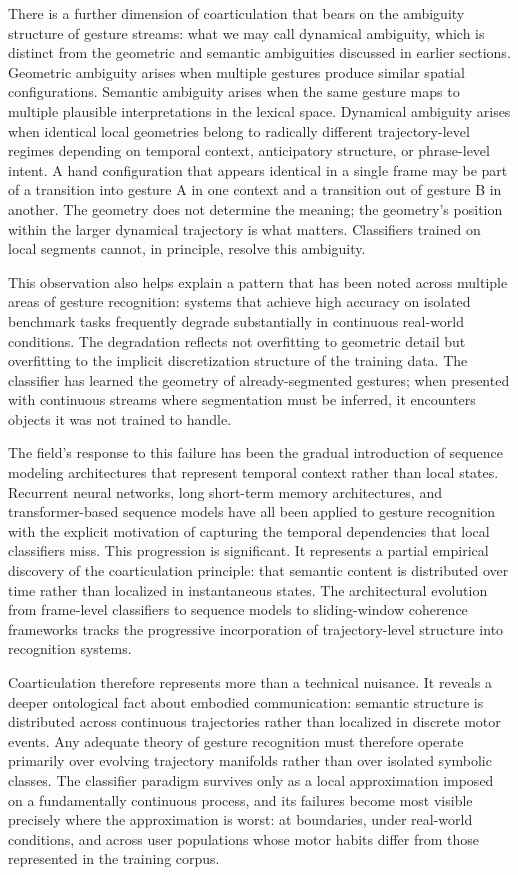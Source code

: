 \documentclass[11pt, a4paper]{article}
\theoremstyle{definition}
\begin{document}
There is a further dimension of coarticulation that bears on the ambiguity structure of gesture streams: what we may call dynamical ambiguity, which is distinct from the geometric and semantic ambiguities discussed in earlier sections. Geometric ambiguity arises when multiple gestures produce similar spatial configurations. Semantic ambiguity arises when the same gesture maps to multiple plausible interpretations in the lexical space. Dynamical ambiguity arises when identical local geometries belong to radically different trajectory-level regimes depending on temporal context, anticipatory structure, or phrase-level intent. A hand configuration that appears identical in a single frame may be part of a transition into gesture A in one context and a transition out of gesture B in another. The geometry does not determine the meaning; the geometry's position within the larger dynamical trajectory is what matters. Classifiers trained on local segments cannot, in principle, resolve this ambiguity.

This observation also helps explain a pattern that has been noted across multiple areas of gesture recognition: systems that achieve high accuracy on isolated benchmark tasks frequently degrade substantially in continuous real-world conditions. The degradation reflects not overfitting to geometric detail but overfitting to the implicit discretization structure of the training data. The classifier has learned the geometry of already-segmented gestures; when presented with continuous streams where segmentation must be inferred, it encounters objects it was not trained to handle.

The field's response to this failure has been the gradual introduction of sequence modeling architectures that represent temporal context rather than local states. Recurrent neural networks, long short-term memory architectures, and transformer-based sequence models have all been applied to gesture recognition with the explicit motivation of capturing the temporal dependencies that local classifiers miss. This progression is significant. It represents a partial empirical discovery of the coarticulation principle: that semantic content is distributed over time rather than localized in instantaneous states. The architectural evolution from frame-level classifiers to sequence models to sliding-window coherence frameworks tracks the progressive incorporation of trajectory-level structure into recognition systems.

Coarticulation therefore represents more than a technical nuisance. It reveals a deeper ontological fact about embodied communication: semantic structure is distributed across continuous trajectories rather than localized in discrete motor events. Any adequate theory of gesture recognition must therefore operate primarily over evolving trajectory manifolds rather than over isolated symbolic classes. The classifier paradigm survives only as a local approximation imposed on a fundamentally continuous process, and its failures become most visible precisely where the approximation is worst: at boundaries, under real-world conditions, and across user populations whose motor habits differ from those represented in the training corpus.
\end{document}
